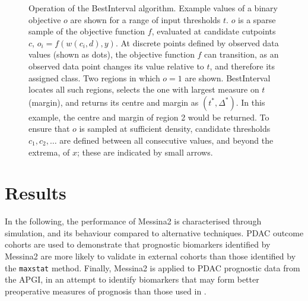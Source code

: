 \documentclass[dissertation.tex]{subfiles}
\begin{document}
\begin{figure}[!htbp]
\caption[Operation of the BestInterval algorithm]{Operation of the BestInterval algorithm.  Example values of a binary objective $o$ are shown for a range of input thresholds $t$.  $o$ is a sparse sample of the objective function $f$, evaluated at candidate cutpoints $c$, $o_i = f(w(c_i,d),y)$.  At discrete points defined by observed data values (shown as dots), the objective function $f$ can transition, as an observed data point changes its value relative to $t$, and therefore its assigned class.  Two regions in which $o = 1$ are shown.  BestInterval locates all such regions, selects the one with largest measure on $t$ (margin), and returns its centre and margin as $(t^*, \Delta^*)$.  In this example, the centre and margin of region 2 would be returned.  To ensure that $o$ is sampled at sufficient density, candidate thresholds $c_1, c_2, \dots$ are defined between all consecutive values, and beyond the extrema, of $x$; these are indicated by small arrows.}
\label{fig:mess-bestinterval}
\end{figure}


\section{Results}
In the following, the performance of Messina2 is characterised through simulation, and its behaviour compared to alternative techniques.  \gls{PDAC} outcome cohorts are used to demonstrate that prognostic biomarkers identified by Messina2 are more likely to validate in external cohorts than those identified by the \texttt{maxstat} method.  Finally, Messina2 is applied to \gls{PDAC} prognostic data from the \gls{APGI}, in an attempt to identify biomarkers that may form better preoperative measures of prognosis than those used in .
\end{document}
